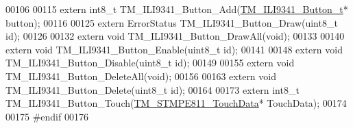 \begin{DoxyCode}
00106 
00115 \textcolor{keyword}{extern} int8\_t TM\_ILI9341\_Button\_Add(\hyperlink{struct_t_m___i_l_i9341___button__t}{TM\_ILI9341\_Button\_t}* button);
00116 
00125 \textcolor{keyword}{extern} ErrorStatus TM\_ILI9341\_Button\_Draw(uint8\_t \textcolor{keywordtype}{id});
00126 
00132 \textcolor{keyword}{extern} \textcolor{keywordtype}{void} TM\_ILI9341\_Button\_DrawAll(\textcolor{keywordtype}{void});
00133 
00140 \textcolor{keyword}{extern} \textcolor{keywordtype}{void} TM\_ILI9341\_Button\_Enable(uint8\_t \textcolor{keywordtype}{id});
00141 
00148 \textcolor{keyword}{extern} \textcolor{keywordtype}{void} TM\_ILI9341\_Button\_Disable(uint8\_t \textcolor{keywordtype}{id});
00149 
00155 \textcolor{keyword}{extern} \textcolor{keywordtype}{void} TM\_ILI9341\_Button\_DeleteAll(\textcolor{keywordtype}{void});
00156 
00163 \textcolor{keyword}{extern} \textcolor{keywordtype}{void} TM\_ILI9341\_Button\_Delete(uint8\_t \textcolor{keywordtype}{id});
00164 
00173 \textcolor{keyword}{extern} int8\_t TM\_ILI9341\_Button\_Touch(\hyperlink{struct_t_m___s_t_m_p_e811___touch_data}{TM\_STMPE811\_TouchData}* TouchData);
00174 
00175 \textcolor{preprocessor}{#endif}
00176 
\end{DoxyCode}
